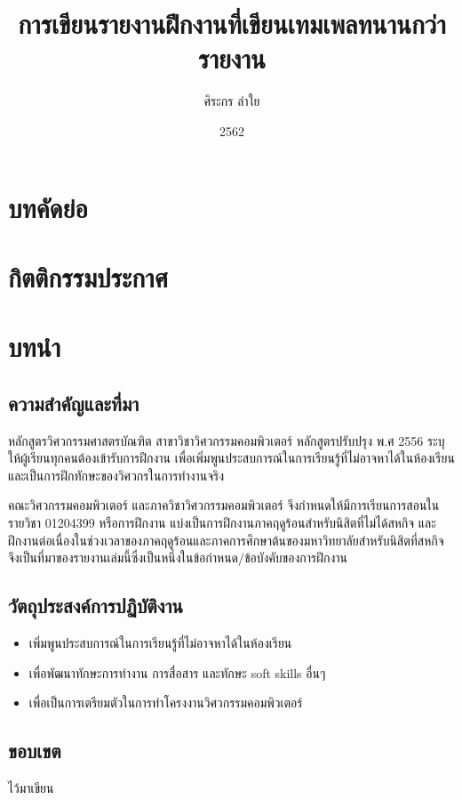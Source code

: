 \documentclass[16pt,a4]{internshipreport}
\title{การเขียนรายงานฝึกงานที่เขียนเทมเพลทนานกว่ารายงาน}
\date{2562}
\author{ศิระกร ลำใย}
\begin{document}
\maketitle

\section*{บทคัดย่อ}
\lipsum[2-4]

\section*{กิตติกรรมประกาศ}
\lipsum[2-4]

\tableofcontents

\section{บทนำ}

\subsection{ความสำคัญและที่มา}
หลักสูตรวิศวกรรมศาสตรบัณฑิต สาขาวิชาวิศวกรรมคอมพิวเตอร์ หลักสูตรปรับปรุง พ.ศ 2556
ระบุให้ผู้เรียนทุกคนต้องเข้ารับการฝึกงาน เพื่อเพิ่มพูนประสบการณ์ในการเรียนรู้ที่ไม่อาจหาได้ในห้องเรียน
และเป็นการฝึกทักษะของวิศวกรในการทำงานจริง

คณะวิศวกรรมคอมพิวเตอร์ และภาควิชาวิศวกรรมคอมพิวเตอร์ จึงกำหนดให้มีการเรียนการสอนในรายวิชา
01204399 หรือการฝึกงาน แบ่งเป็นการฝึกงานภาคฤดูร้อนสำหรับนิสิตที่ไม่ได้สหกิจ
และฝึกงานต่อเนื่องในช่วงเวลาของภาคฤดูร้อนและภาคการศึกษาต้นของมหาวิทยาลัยสำหรับนิสิตที่สหกิจ
จึงเป็นที่มาของรายงานเล่มนี้ซึ่งเป็นหนึ่งในข้อกำหนด/ข้อบังคับของการฝึกงาน

\subsection{วัตถุประสงค์การปฏิบัติงาน}
\begin{itemize}
    \item เพิ่มพูนประสบการณ์ในการเรียนรู้ที่ไม่อาจหาได้ในห้องเรียน
    \item เพื่อพัฒนาทักษะการทำงาน การสื่อสาร และทักษะ soft skills อื่นๆ
    \item เพื่อเป็นการเตรียมตัวในการทำโครงงานวิศวกรรมคอมพิวเตอร์
\end{itemize}

\subsection{ขอบเขต}
ไว้มาเขียน
\end{document}
